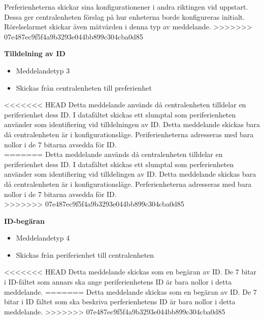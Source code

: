 Perferienheterna skickar sina konfigurationener i andra riktingen vid uppstart.
Dessa ger centralenheten förslag på hur enheterna borde konfigureras initialt. Rörelselarmet skickar även mätvärden i denna typ av meddelande.
>>>>>>> 07e487ec9f5f4a9b3293e044bb899c304cba0d85


\textbf{Tilldelning av ID}
\begin{itemize}
    \item Meddelandetyp 3
    \item Skickas från centralenheten till preferienhet
\end{itemize}
<<<<<<< HEAD
Detta meddelande används då centralenheten tilldelar en periferienhet dess ID. I datafältet skickas ett slumptal som periferienheten använder som identifiering vid tilldelningen av ID. Detta meddelande skickas bara då centralenheten är i konfigurationsläge. Periferienheterna adresseras med bara nollor i de 7 bitarna avsedda för ID. \\
=======
Detta meddelande används då centralenheten tilldelar en periferienhet dess ID.
I datafältet skickas ett slumptal som perferienheten använder som identifiering vid tilldelingen av ID.
Detta meddelande skickas bara då centralenheten är i konfigurationsläge.
Perferienheterna adresseras med bara nollor i de 7 bitarna avsedda för ID. \\
>>>>>>> 07e487ec9f5f4a9b3293e044bb899c304cba0d85


\textbf{ID-begäran}
\begin{itemize}
    \item Meddelandetyp 4
    \item Skickas från periferienhet till centralenheten
\end{itemize}
<<<<<<< HEAD
Detta meddelande skickas som en begäran av ID. De 7 bitar i ID-fältet som annars ska ange periferienhetens ID är bara nollor i detta meddelande.
=======
Detta meddelande skickas som en begäran av ID.
De 7 bitar i ID fältet som ska beskriva perferienhetens ID är bara nollor i detta meddelande.
>>>>>>> 07e487ec9f5f4a9b3293e044bb899c304cba0d85
